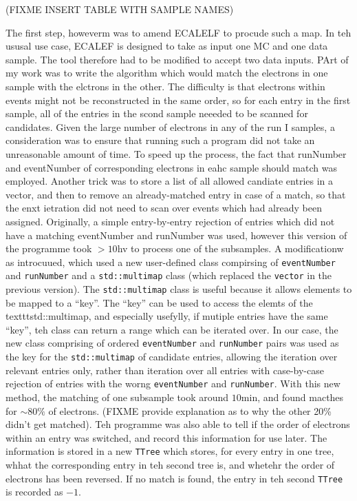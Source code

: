 \documentclass[10pt]{article}
\begin{document}
(FIXME INSERT TABLE WITH SAMPLE NAMES)

The first step, howeverm was to amend ECALELF to procude such a map. In teh ususal use case, ECALEF is designed to take as input one MC and one data sample. The tool therefore had to be modified to accept two data inputs. PArt of my work was to write the algorithm which would match the electrons in one sample with the elctrons in the other. The difficulty is that electrons within events might not be reconstructed in the same order, so for each entry in the first sample, all of the entries in the scond sample neeeded to be scanned for candidates. Given the large number of electrons in any of the run I samples, a consideration was to ensure that running such a program did not take an unreasonable amount of time. To speed up the process, the fact that runNumber and eventNumber of corresponding electrons in eahc sample should match was employed. Another trick was to store a list of all allowed candiate entries in a vector, and then to remove an already-matched entry in case of a match, so that the enxt ietration did not need to scan over events which had already been assigned. Originally, a simple entry-by-entry rejection of entries which did not have a matching eventNumber and runNumber was used, however this version of the programme took $>10$hv to process one of the subsamples. A modificationw as introcuued, which used a new user-defined class compirsing of \texttt{eventNumber} and \texttt{runNumber}  and  a \texttt{std::multimap} class (which replaced the \texttt{vector} in the previous version). The \texttt{std::multimap} class is useful because it allows elements to be mapped to a ``key''. The ``key'' can be used to access the elemts of the texttt{std::multimap}, and especially usefylly, if mutiple entries have the same ``key'', teh class can return a range which can be iterated over. In our case, the new class comprising of ordered \texttt{eventNumber} and \texttt{runNumber} pairs was used as the key for the  \texttt{std::multimap} of candidate entries, allowing the iteration over relevant entries only, rather than iteration over all entries with case-by-case rejection of entries with the worng \texttt{eventNumber} and \texttt{runNumber}. With this new method, the matching of one subsample took around $10$min, and found macthes for $\sim 80\%$ of electrons. (FIXME provide explanation as to why the other 20\% didn't get matched). Teh programme was also able to tell if the order of electrons within an entry was switched, and record this information for use later. The information is stored in a new \texttt{TTree} which stores, for every entry in one tree, whhat the corresponding entry in teh second tree is, and whetehr the order of electrons has been reversed. If no match is found, the entry in teh second \texttt{TTree} is recorded as $-1$.
\end{document}
